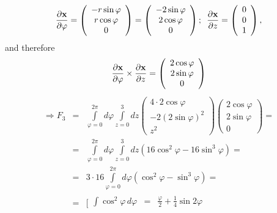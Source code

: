 {\begin{enumerate}
$$
  \frac{\partial {\bf x}}{\partial \varphi} =
  \left(
    \begin{array}{c}
      -r \sin \varphi \\
       r \cos \varphi \\
       0
    \end{array}
  \right)=
  \left(
    \begin{array}{c}
      -2 \sin \varphi \\
       2 \cos \varphi \\
       0
    \end{array}
  \right); \enspace
  \frac{\partial {\bf x}}{\partial z} =
  \left(
    \begin{array}{c}
      0 \\
      0 \\
      1
    \end{array}
  \right) ,
$$
and therefore
$$
    \frac{\partial {\bf x}}{\partial \varphi} \times
    \frac{\partial {\bf x}}{\partial z}
 =
  \left(
    \begin{array}{c}
      2 \cos \varphi \\
      2 \sin \varphi \\
      0
    \end{array}
  \right)
$$
\begin{eqnarray*}
  \Longrightarrow
  F_3 & = & \int \limits_{\varphi =0}^{2 \pi} \!\! d\varphi
    \int \limits_{z=0}^3 \!\! dz
    \left(
      \begin{array}{c}
        4 \cdot 2 \cos \varphi \\
        -2(2 \sin \varphi)^2 \\
        z^2
      \end{array}
    \right)
    \left(
      \begin{array}{c}
        2 \cos \varphi \\
        2 \sin \varphi \\
        0
      \end{array}
    \right)= \\
    &= & \int \limits_{\varphi =0}^{2 \pi} \!\! d\varphi
    \int \limits_{z=0}^3 \!\! dz
    \left(16 \cos^2 \varphi -16 \sin^3 \varphi\right) = \\
  & = & 3 \cdot 16 \int \limits_{\varphi =0}^{2 \pi} \!\! d\varphi
    \left( \cos^2\varphi - \sin^3 \varphi \right) = \\
  & = &
    \Biggl[
      \begin{array}{rcl}
        \int \cos^2 \varphi \, d\varphi & = & \frac{\varphi}{2}+
          \frac{1}{4} \sin 2 \varphi \\

\end{array}
\end{eqnarray*}
\end{enumerate}}
